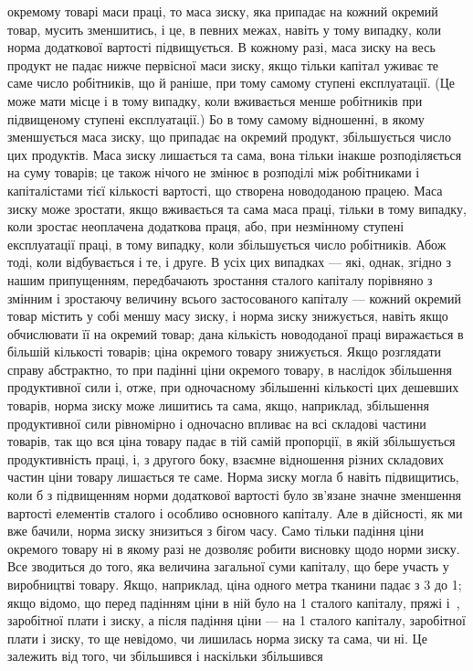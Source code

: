 \parcont{}  %
окремому товарі маси праці, то маса зиску, яка припадає на кожний окремий товар, мусить зменшитись,
і це, в певних межах, навіть у тому випадку, коли норма додаткової вартості підвищується. В кожному
разі, маса зиску на весь продукт не падає нижче первісної маси зиску, якщо тільки капітал уживає те
саме число робітників, що й раніше, при тому самому ступені експлуатації. (Це може мати місце і в
тому випадку, коли вживається менше робітників при підвищеному ступені експлуатації.) Бо в тому
самому відношенні, в якому зменшується маса зиску, що припадає на окремий продукт, збільшується
число цих продуктів. Маса зиску лишається та сама, вона тільки інакше розподіляється на суму
товарів; це також нічого не змінює в розподілі між робітниками і капіталістами тієї кількості
вартості, що створена новододаною працею. Маса зиску може зростати, якщо вживається та сама маса
праці, тільки в тому випадку, коли зростає неоплачена додаткова праця, або, при незмінному ступені
експлуатації праці, в тому випадку, коли збільшується число робітників. Абож тоді, коли відбувається
і те, і друге. В усіх цих випадках — які, однак, згідно з нашим припущенням, передбачають зростання
сталого капіталу порівняно з змінним і зростаючу величину всього застосованого капіталу — кожний
окремий товар містить у собі меншу масу зиску, і норма зиску знижується, навіть якщо обчислювати її
на окремий товар; дана кількість новододаної праці виражається в більшій кількості товарів; ціна
окремого товару знижується. Якщо
розглядати справу абстрактно, то при падінні ціни окремого товару, в наслідок збільшення
продуктивної сили і, отже, при одночасному збільшенні кількості цих дешевших товарів, норма зиску
може лишитись та сама, якщо, наприклад, збільшення продуктивної сили рівномірно і одночасно впливає
на всі складові частини товарів, так що вся ціна товару падає в тій самій пропорції, в якій
збільшується продуктивність праці, і, з другого боку, взаємне відношення різних складових частин
ціни товару лишається те саме. Норма зиску могла б навіть підвищитись, коли б з підвищенням норми
додаткової вартості було зв’язане значне зменшення вартості елементів сталого і особливо основного
капіталу. Але в дійсності, як ми вже бачили, норма зиску знизиться з бігом часу. Само тільки падіння
ціни окремого товару ні в якому разі не дозволяє робити висновку щодо норми зиску. Все зводиться до
того, яка величина загальної суми капіталу, що бере участь у виробництві товару. Якщо, наприклад,
ціна одного метра тканини падає з 3 до 1; якщо відомо, що перед падінням ціни
в ній було на 1 сталого капіталу, пряжі і~,  заробітної плати і  зиску, а після падіння ціни — на 1 сталого капіталу,  заробітної плати і
 зиску, то ще невідомо, чи лишилась норма зиску та сама, чи ні. Це залежить від того, чи
збільшився і наскільки збільшився
\parbreak{}  %
